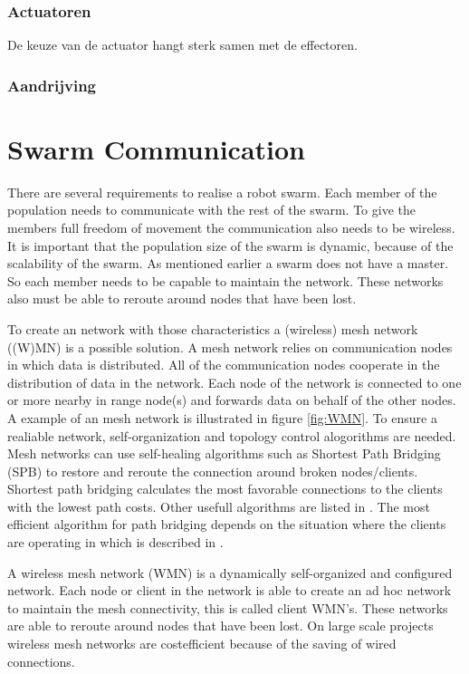 \documentclass[10pt,a4paper]{article}
\begin{document}
\subsubsection{Actuatoren}

De keuze van de actuator hangt sterk samen met de effectoren.

\subsubsection{Aandrijving}

\newpage
\section{Swarm Communication}
There are several requirements to realise a robot swarm. Each member of the population needs to communicate with the rest of the swarm. To give the members full freedom of movement the communication also needs to be wireless. It is important that the population size of the swarm is dynamic, because of the scalability of the swarm. As mentioned earlier a swarm does not have a master. So each member needs to be capable to maintain the network. These networks also must be able to reroute around nodes that have been lost.

To create an network with those characteristics a (wireless) mesh network ((W)MN) is a possible solution. A mesh network relies on communication nodes in which data is distributed. All of the communication nodes cooperate in the distribution of data in the network. Each node of the network is connected to one or more nearby in range node(s) and forwards data on behalf of the other nodes. \cite{meshnetworking} A example of an mesh network is illustrated in figure \ref{fig:WMN}. To ensure a realiable network, self-organization and topology control alogorithms are needed.\cite{WMN1} Mesh networks can use self-healing algorithms such as Shortest Path Bridging (SPB) to restore and reroute the connection around broken nodes/clients. Shortest path bridging calculates the most favorable connections to the clients with the lowest path costs. \cite{SPB} Other usefull algorithms are listed in \cite{position-based}. The most efficient algorithm for path bridging depends on the situation where the clients are operating in which is described in \cite{position-based}.

A wireless mesh network (WMN) is a dynamically self-organized and configured network. \cite{WMN1} Each node or client in the network is able to create an ad hoc network to maintain the mesh connectivity, this is called client WMN's. These networks are able to reroute around nodes that have been lost. On large scale projects wireless mesh networks are costefficient because of the saving of wired connections.\cite{meshnetworking}
\end{document}
